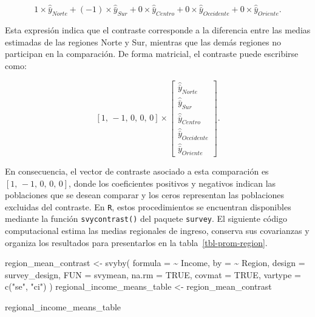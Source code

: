 \documentclass[
  spanish,
  11pt,
  letterpaper,
  oneside,
  open=any]{scrbook}
\newenvironment{Shaded}{\begin{snugshade}}{\end{snugshade}}
\newcommand{\AttributeTok}[1]{\textcolor[rgb]{0.40,0.45,0.13}{#1}}
\newcommand{\ConstantTok}[1]{\textcolor[rgb]{0.56,0.35,0.01}{#1}}
\newcommand{\FunctionTok}[1]{\textcolor[rgb]{0.28,0.35,0.67}{#1}}
\newcommand{\NormalTok}[1]{\textcolor[rgb]{0.00,0.23,0.31}{#1}}
\newcommand{\OtherTok}[1]{\textcolor[rgb]{0.00,0.23,0.31}{#1}}
\newcommand{\SpecialCharTok}[1]{\textcolor[rgb]{0.37,0.37,0.37}{#1}}
\newcommand{\StringTok}[1]{\textcolor[rgb]{0.13,0.47,0.30}{#1}}
\begin{document}
\[
1\times\hat{\bar{y}}_{Norte}+\left(-1\right)\times\hat{\bar{y}}_{Sur}+0\times\hat{\bar{y}}_{Centro}+0\times\hat{\bar{y}}_{Occidente}+0\times\hat{\bar{y}}_{Oriente}.
\]

Esta expresión indica que el contraste corresponde a la diferencia entre
las medias estimadas de las regiones Norte y Sur, mientras que las demás
regiones no participan en la comparación. De forma matricial, el
contraste puede escribirse como:

\[
 \left[1,\,-1,\,0,\,0,\,0\right]
 \times
 \left[\begin{array}{c}
\hat{\bar{y}}_{Norte}\\
\hat{\bar{y}}_{Sur}\\
\hat{\bar{y}}_{Centro}\\
\hat{\bar{y}}_{Occidente}\\
\hat{\bar{y}}_{Oriente}
\end{array}\right].
\]

En consecuencia, el vector de contraste asociado a esta comparación es
\(\left[1,\,-1,\,0,\,0,\,0\right]\), donde los coeficientes positivos y
negativos indican las poblaciones que se desean comparar y los ceros
representan las poblaciones excluidas del contraste. En \texttt{R},
estos procedimientos se encuentran disponibles mediante la función
\texttt{svycontrast()} del paquete \texttt{survey}. El siguiente código
computacional estima las medias regionales de ingreso, conserva sus
covarianzas y organiza los resultados para presentarlos en la
tabla~\ref{tbl-prom-region}.

\begin{Shaded}
\begin{Highlighting}[]
\NormalTok{region\_mean\_contrast }\OtherTok{\textless{}{-}} \FunctionTok{svyby}\NormalTok{(}
  \AttributeTok{formula =} \SpecialCharTok{\textasciitilde{}}\NormalTok{ Income,}
  \AttributeTok{by =} \SpecialCharTok{\textasciitilde{}}\NormalTok{ Region,}
  \AttributeTok{design =}\NormalTok{ survey\_design,}
  \AttributeTok{FUN =}\NormalTok{ svymean,}
  \AttributeTok{na.rm =} \ConstantTok{TRUE}\NormalTok{,}
  \AttributeTok{covmat =} \ConstantTok{TRUE}\NormalTok{,}
  \AttributeTok{vartype =} \FunctionTok{c}\NormalTok{(}\StringTok{"se"}\NormalTok{, }\StringTok{"ci"}\NormalTok{)}
\NormalTok{)}
\NormalTok{regional\_income\_means\_table }\OtherTok{\textless{}{-}}\NormalTok{ region\_mean\_contrast}

\NormalTok{regional\_income\_means\_table}
\end{Highlighting}
\end{Shaded}
\end{document}
